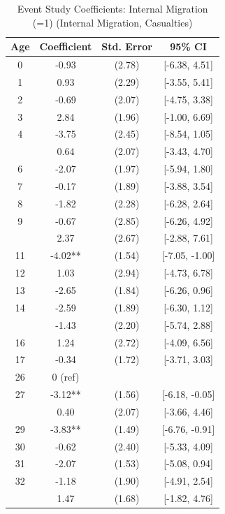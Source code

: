 \begin{table}[!h]
\centering
\caption{\label{tab:event_study_8d_internal_migration_casualties}Event Study Coefficients: Internal Migration (=1) (Internal Migration, Casualties)}
\centering
\fontsize{9}{11}\selectfont
\begin{threeparttable}
\begin{tabular}[t]{cccc}
\toprule
Age & Coefficient & Std. Error & 95\% CI\\
\midrule
0 & -0.93 & (2.78) & {}[-6.38, 4.51]\\
1 & 0.93 & (2.29) & {}[-3.55, 5.41]\\
2 & -0.69 & (2.07) & {}[-4.75, 3.38]\\
3 & 2.84 & (1.96) & {}[-1.00, 6.69]\\
4 & -3.75 & (2.45) & {}[-8.54, 1.05]\\
\addlinespace
5 & 0.64 & (2.07) & {}[-3.43, 4.70]\\
6 & -2.07 & (1.97) & {}[-5.94, 1.80]\\
7 & -0.17 & (1.89) & {}[-3.88, 3.54]\\
8 & -1.82 & (2.28) & {}[-6.28, 2.64]\\
9 & -0.67 & (2.85) & {}[-6.26, 4.92]\\
\addlinespace
10 & 2.37 & (2.67) & {}[-2.88, 7.61]\\
11 & -4.02** & (1.54) & {}[-7.05, -1.00]\\
12 & 1.03 & (2.94) & {}[-4.73, 6.78]\\
13 & -2.65 & (1.84) & {}[-6.26, 0.96]\\
14 & -2.59 & (1.89) & {}[-6.30, 1.12]\\
\addlinespace
15 & -1.43 & (2.20) & {}[-5.74, 2.88]\\
16 & 1.24 & (2.72) & {}[-4.09, 6.56]\\
17 & -0.34 & (1.72) & {}[-3.71, 3.03]\\
26 & 0 (ref) &  & \\
27 & -3.12** & (1.56) & {}[-6.18, -0.05]\\
\addlinespace
28 & 0.40 & (2.07) & {}[-3.66, 4.46]\\
29 & -3.83** & (1.49) & {}[-6.76, -0.91]\\
30 & -0.62 & (2.40) & {}[-5.33, 4.09]\\
31 & -2.07 & (1.53) & {}[-5.08, 0.94]\\
32 & -1.18 & (1.90) & {}[-4.91, 2.54]\\
\addlinespace
33 & 1.47 & (1.68) & {}[-1.82, 4.76]\\

\end{tabular}
\end{threeparttable}
\end{table}
